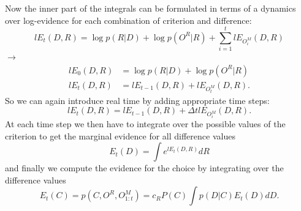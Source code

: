 \documentclass[10pt,a4paper]{article}
\begin{document}
Now the inner part of the integrals can be formulated in terms of a dynamics over log-evidence for each combination of criterion and difference:
\begin{equation}
lE_t(D, R) = \log p(R | D) + \log p(O^R|R) + \sum_{i=1}^t lE_{O^M_i}(D, R)
\end{equation}
$\rightarrow$
\begin{align}
lE_0(D, R) &= \log p(R | D) + \log p(O^R|R)\\
lE_t(D, R) &= lE_{t-1}(D, R) + lE_{O^M_t}(D, R).
\end{align}
So we can again introduce real time by adding appropriate time steps:
\begin{equation}
lE_t(D, R) = lE_{t-1}(D, R) + \Delta t lE_{O^M_i}(D, R).
\end{equation}
At each time step we then have to integrate over the possible values of the criterion to get the marginal evidence for all difference values
\begin{equation}\label{eq:diff_ev}
E_t(D) = \int e^{lE_t(D, R)} dR
\end{equation}
and finally we compute the evidence for the choice by integrating over the difference values
\begin{equation}
E_t(C) = p(C, O^R, O^M_{1:t}) = c_R P(C) \int p(D | C) E_t(D) dD.
\end{equation}
\end{document}
